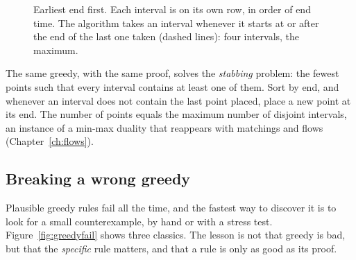 \begin{figure}[htbp]
\centering
{}
\caption{Earliest end first. Each interval is on its own row, in order of end time. The algorithm takes an interval whenever
it starts at or after the end of the last one taken (dashed lines): four intervals, the maximum.}
\label{fig:intervalsched}
\end{figure}


The same greedy, with the same proof, solves the \emph{stabbing} problem: the fewest points such that every interval contains
at least one of them. Sort by end, and whenever an interval does not contain the last point placed, place a new point at its
end. The number of points equals the maximum number of disjoint intervals, an instance of a min-max duality that reappears
with matchings and flows (Chapter~\ref{ch:flows}).

\subsection{Breaking a wrong greedy}

Plausible greedy rules fail all the time, and the fastest way to discover it is to look for a small counterexample, by hand or
with a stress test. Figure~\ref{fig:greedyfail} shows three classics. The lesson is not that greedy is bad, but that the
\emph{specific} rule matters, and that a rule is only as good as its proof.


